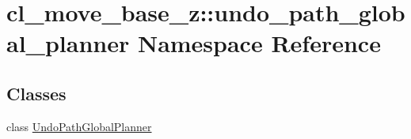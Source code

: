 \hypertarget{namespacecl__move__base__z_1_1undo__path__global__planner}{}\section{cl\+\_\+move\+\_\+base\+\_\+z\+:\+:undo\+\_\+path\+\_\+global\+\_\+planner Namespace Reference}
\label{namespacecl__move__base__z_1_1undo__path__global__planner}
\subsection*{Classes}
\begin{DoxyCompactItemize}
\item 
class \hyperlink{classcl__move__base__z_1_1undo__path__global__planner_1_1UndoPathGlobalPlanner}{Undo\+Path\+Global\+Planner}
\end{DoxyCompactItemize}
